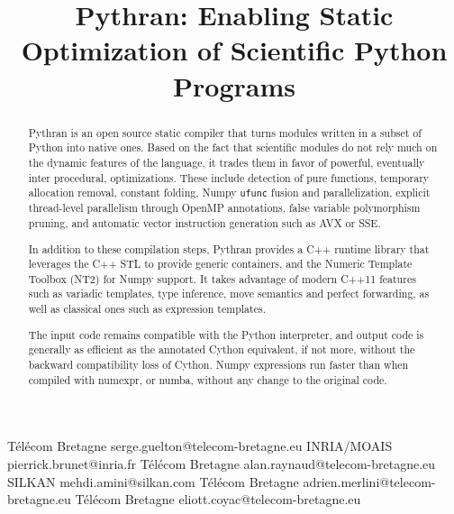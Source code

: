 \documentclass[10pt, onecolumn, preprint]{sigplanconf}
\begin{document}
\title{Pythran: Enabling Static Optimization of Scientific Python Programs}

           {T{\'e}l{\'e}com Bretagne}
           {serge.guelton@telecom-bretagne.eu}
           {INRIA/MOAIS}
           {pierrick.brunet@inria.fr}
           {T{\'e}l{\'e}com Bretagne}
           {alan.raynaud@telecom-bretagne.eu}
           {SILKAN}
           {mehdi.amini@silkan.com}
           {T{\'e}l{\'e}com Bretagne}
           {adrien.merlini@telecom-bretagne.eu}
           {T{\'e}l{\'e}com Bretagne}
           {eliott.coyac@telecom-bretagne.eu}

\maketitle

\begin{abstract}

    Pythran is an open source static compiler that turns modules written
    in a subset of Python into native ones. Based on the fact that scientific
    modules do not rely much on the dynamic features of the language, it trades
    them in favor of powerful, eventually inter procedural, optimizations.
    These include detection of pure functions, temporary allocation removal,
    constant folding, Numpy \texttt{ufunc} fusion and parallelization, explicit
    thread-level parallelism through OpenMP annotations, false variable
    polymorphism pruning, and automatic vector instruction generation such as
    AVX or SSE.

    In addition to these compilation steps, Pythran provides a C++ runtime library that
    leverages the C++ STL to provide generic containers, and the Numeric
    Template Toolbox (NT2) for Numpy support. It takes advantage of modern C++11
    features such as variadic templates, type inference, move semantics and
    perfect forwarding, as well as classical ones such as expression templates.

    The input code remains compatible with the Python interpreter, and output
    code is generally as efficient as the annotated Cython equivalent, if not
    more, without the backward compatibility loss of Cython. Numpy expressions
    run faster than when compiled with numexpr, or numba, without any change to
    the original code. 


\end{abstract}
\end{document}
